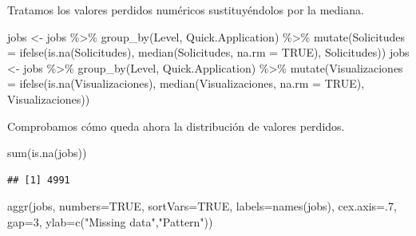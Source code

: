 \documentclass[
]{article}
\newenvironment{Shaded}{\begin{snugshade}}{\end{snugshade}}
\newcommand{\DataTypeTok}[1]{\textcolor[rgb]{0.87,0.87,0.75}{#1}}
\newcommand{\DecValTok}[1]{\textcolor[rgb]{0.86,0.86,0.80}{#1}}
\newcommand{\KeywordTok}[1]{\textcolor[rgb]{0.94,0.87,0.69}{#1}}
\newcommand{\NormalTok}[1]{\textcolor[rgb]{0.80,0.80,0.80}{#1}}
\newcommand{\OperatorTok}[1]{\textcolor[rgb]{0.94,0.94,0.82}{#1}}
\newcommand{\OtherTok}[1]{\textcolor[rgb]{0.94,0.94,0.56}{#1}}
\newcommand{\StringTok}[1]{\textcolor[rgb]{0.80,0.58,0.58}{#1}}
\begin{document}
Tratamos los valores perdidos numéricos sustituyéndolos por la mediana.

\begin{Shaded}
\begin{Highlighting}[]
\NormalTok{jobs \textless{}{-}}\StringTok{ }\NormalTok{jobs }\OperatorTok{\%\textgreater{}\%}
\StringTok{  }\KeywordTok{group\_by}\NormalTok{(Level, Quick.Application) }\OperatorTok{\%\textgreater{}\%}
\StringTok{    }\KeywordTok{mutate}\NormalTok{(}\DataTypeTok{Solicitudes =} \KeywordTok{ifelse}\NormalTok{(}\KeywordTok{is.na}\NormalTok{(Solicitudes), }\KeywordTok{median}\NormalTok{(Solicitudes, }\DataTypeTok{na.rm =} \OtherTok{TRUE}\NormalTok{), Solicitudes))}
\NormalTok{jobs \textless{}{-}}\StringTok{ }\NormalTok{jobs }\OperatorTok{\%\textgreater{}\%}
\StringTok{  }\KeywordTok{group\_by}\NormalTok{(Level, Quick.Application) }\OperatorTok{\%\textgreater{}\%}
\StringTok{    }\KeywordTok{mutate}\NormalTok{(}\DataTypeTok{Visualizaciones =} \KeywordTok{ifelse}\NormalTok{(}\KeywordTok{is.na}\NormalTok{(Visualizaciones), }\KeywordTok{median}\NormalTok{(Visualizaciones, }\DataTypeTok{na.rm =} \OtherTok{TRUE}\NormalTok{), Visualizaciones))}
\end{Highlighting}
\end{Shaded}

Comprobamos cómo queda ahora la distribución de valores perdidos.

\begin{Shaded}
\begin{Highlighting}[]
\KeywordTok{sum}\NormalTok{(}\KeywordTok{is.na}\NormalTok{(jobs))}
\end{Highlighting}
\end{Shaded}

\begin{verbatim}
## [1] 4991
\end{verbatim}

\begin{Shaded}
\begin{Highlighting}[]
\KeywordTok{aggr}\NormalTok{(jobs, }\DataTypeTok{numbers=}\OtherTok{TRUE}\NormalTok{, }\DataTypeTok{sortVars=}\OtherTok{TRUE}\NormalTok{, }\DataTypeTok{labels=}\KeywordTok{names}\NormalTok{(jobs),}
\DataTypeTok{cex.axis=}\NormalTok{.}\DecValTok{7}\NormalTok{, }\DataTypeTok{gap=}\DecValTok{3}\NormalTok{, }\DataTypeTok{ylab=}\KeywordTok{c}\NormalTok{(}\StringTok{"Missing data"}\NormalTok{,}\StringTok{"Pattern"}\NormalTok{))}
\end{Highlighting}
\end{Shaded}
\end{document}
